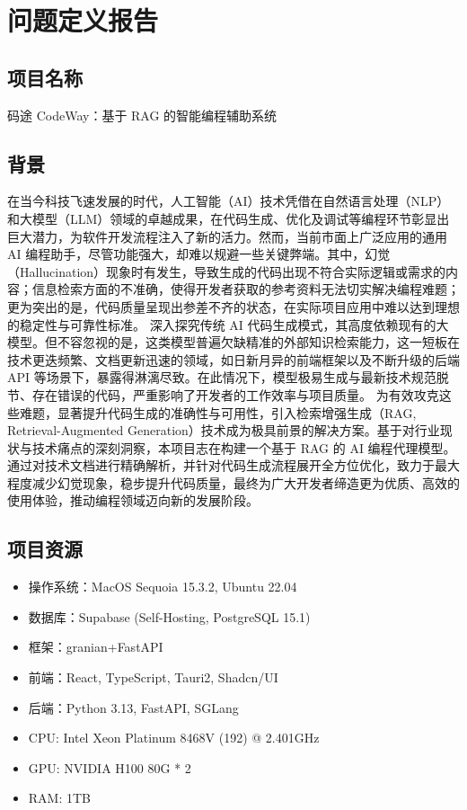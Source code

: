 \documentclass[
    report,     %
    oneside,    %
    UTF8,       %
    zihao=-4    %
]{config} %
\begin{document}

\SetArabicPageNumber{} %


\chapter{问题定义报告}

\section{项目名称}
码途 CodeWay：基于 RAG 的智能编程辅助系统
\section{背景}
在当今科技飞速发展的时代，人工智能（AI）技术凭借在自然语言处理（NLP）和大模型（LLM）领域的卓越成果，在代码生成、优化及调试等编程环节彰显出巨大潜力，为软件开发流程注入了新的活力。然而，当前市面上广泛应用的通用 AI 编程助手，尽管功能强大，却难以规避一些关键弊端。其中，幻觉（Hallucination）现象时有发生，导致生成的代码出现不符合实际逻辑或需求的内容；信息检索方面的不准确，使得开发者获取的参考资料无法切实解决编程难题；更为突出的是，代码质量呈现出参差不齐的状态，在实际项目应用中难以达到理想的稳定性与可靠性标准。
深入探究传统 AI 代码生成模式，其高度依赖现有的大模型。但不容忽视的是，这类模型普遍欠缺精准的外部知识检索能力，这一短板在技术更迭频繁、文档更新迅速的领域，如日新月异的前端框架以及不断升级的后端 API 等场景下，暴露得淋漓尽致。在此情况下，模型极易生成与最新技术规范脱节、存在错误的代码，严重影响了开发者的工作效率与项目质量。
为有效攻克这些难题，显著提升代码生成的准确性与可用性，引入检索增强生成（RAG, Retrieval-Augmented Generation）技术成为极具前景的解决方案。基于对行业现状与技术痛点的深刻洞察，本项目志在构建一个基于 RAG 的 AI 编程代理模型。通过对技术文档进行精确解析，并针对代码生成流程展开全方位优化，致力于最大程度减少幻觉现象，稳步提升代码质量，最终为广大开发者缔造更为优质、高效的使用体验，推动编程领域迈向新的发展阶段。

\section{项目资源}
\begin{itemize}
    \item 操作系统：MacOS Sequoia 15.3.2, Ubuntu 22.04
    \item 数据库：Supabase (Self-Hosting, PostgreSQL 15.1)
    \item 框架：granian+FastAPI
    \item 前端：React, TypeScript, Tauri2, Shadcn/UI
    \item 后端：Python 3.13, FastAPI, SGLang
    \item CPU: Intel Xeon Platinum 8468V (192) @ 2.401GHz
    \item GPU: NVIDIA H100 80G * 2
    \item RAM: 1TB
\end{itemize}
\end{document}
